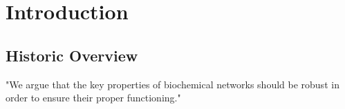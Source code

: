 \section{Introduction}
\label{sec:introduction}
\subsection{Historic Overview}
\label{subsec:introduction-history}
\begin{frame}{\insertsubsection}
	
\end{frame}
%
%
\begin{frame}{\insertsubsection}
	"We argue that the key properties of biochemical networks should be robust in order to ensure their proper functioning."~\cite{Barkai1997}
\end{frame}
%
%